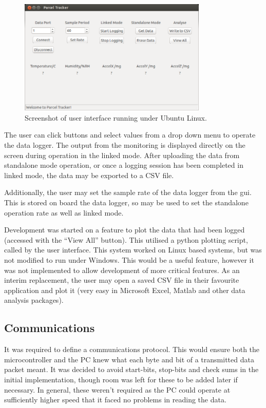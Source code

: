 \documentclass[a4paper,10pt]{article}  %
\begin{document}
\begin{figure}[!htb]
  \begin{center}
    \includegraphics[width=0.8\textwidth]{GUI_Screenshot.png}
  \end{center}
  \caption{Screenshot of user interface running under Ubuntu Linux.}
  \label{fig:guiss}
\end{figure}

The user can click buttons and select values from a drop down menu to
operate the data logger. The output from the monitoring is displayed
directly on the screen during operation in the linked mode. After
uploading the data from standalone mode operation, or once a logging
session has been completed in linked mode, the data may be exported to
a CSV file.

Additionally, the user may set the sample rate of the data
logger from the gui. This is stored on board the data logger, so may
be used to set the standalone operation rate as well as linked
mode.

Development was started on a feature to plot the data that had been
logged (accessed with the ``View All'' button). This utilised a python
plotting script, called by the user interface. This system worked on
Linux based systems, but was not modified to run under Windows. This
would be a useful feature, however it was not implemented to allow
development of more critical features. As an interim replacement, the
user may open a saved CSV file in their favourite application and plot
it (very easy in Microsoft Excel, Matlab and other data analysis
packages).

\subsection{Communications}

It was required to define a communications protocol. This would ensure
both the microcontroller and the PC knew what each byte and bit of a
transmitted data packet meant. It was decided to avoid start-bits,
stop-bits and check sums in the initial implementation, though room
was left for these to be added later if necessary. In general, these
weren't required as the PC could operate at sufficiently higher speed
that it faced no problems in reading the data.
\end{document}
